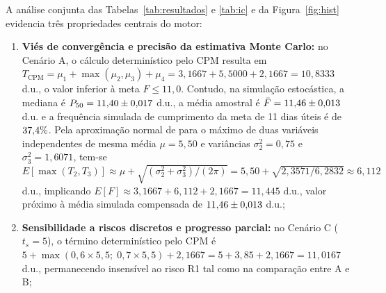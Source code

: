 \documentclass[12pt,openany,oneside,a4paper,english,brazilian,sumario=tradicional]{abntex2}
\begin{document}
A análise conjunta das Tabelas~\ref{tab:resultados} e \ref{tab:ic} e da Figura~\ref{fig:hist} evidencia três propriedades centrais do motor:
\begin{enumerate}
  \item \textbf{Viés de convergência e precisão da estimativa Monte Carlo:} no Cenário A, o cálculo determinístico pelo CPM resulta em $T_{\mathrm{CPM}} = \mu_1 + \max(\mu_2, \mu_3) + \mu_4 = 3{,}1667 + 5{,}5000 + 2{,}1667 = 10{,}8333$ d.u., o valor inferior à meta $F \le 11{,}0$. Contudo, na simulação estocástica, a mediana é $P_{50} = 11{,}40{} \pm 0{,}017{}$ d.u., a média amostral é $\bar{F} = 11{,}46{} \pm 0{,}013{}$ d.u. e a frequência simulada de cumprimento da meta de 11 dias úteis é de $37{,}4{}\%$. Pela aproximação normal de  para o máximo de duas variáveis independentes de mesma média $\mu=5{,}50$ e variâncias $\sigma_2^2=0{,}75$ e $\sigma_3^2=1{,}6071$, tem-se $E[\max(T_2,T_3)] \approx \mu + \sqrt{(\sigma_2^2+\sigma_3^2)/(2\pi)} = 5{,}50 + \sqrt{2{,}3571/6{,}2832} \approx 6{,}112$ d.u., implicando $E[F] \approx 3{,}1667 + 6{,}112 + 2{,}1667 = 11{,}445$ d.u., valor próximo à média simulada compensada de $11{,}46{} \pm 0{,}013{}$ d.u.;
  \item \textbf{Sensibilidade a riscos discretos e progresso parcial:} no Cenário C ($t_s=5$), o término determinístico pelo CPM é $5 + \max(0{,}6\times 5{,}5;\; 0{,}7\times 5{,}5) + 2{,}1667 = 5 + 3{,}85 + 2{,}1667 = 11{,}0167$ d.u., permanecendo insensível ao risco R1 tal como na comparação entre A e B;

\end{enumerate}
\end{document}
